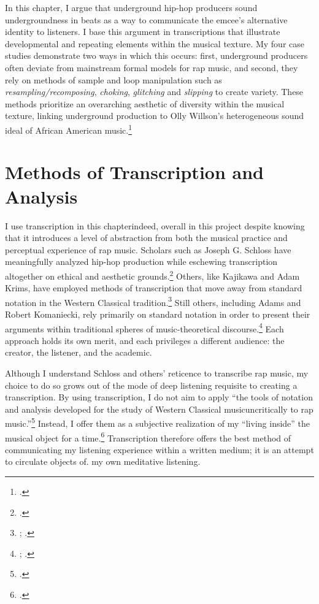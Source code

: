 In this chapter, I argue that underground hip-hop producers sound undergroundness in beats
as a way to communicate the emcee's alternative identity to listeners. I base this argument
in transcriptions that illustrate developmental and repeating elements within the musical 
texture. My four case studies demonstrate two ways in which this occurs: first, underground
producers often deviate from mainstream formal models for rap music, and second, they rely
on methods of sample and loop manipulation such as \emph{resampling/recomposing}, 
\emph{choking}, \emph{glitching} and \emph{slipping} to create variety. These methods
prioritize an overarching aesthetic of diversity within the musical texture, linking
underground production to Olly Willson's heterogeneous sound ideal of African American 
music.\footnote{
    \cite{ollywilsonHeterogeneousSoundIdeal1992}.}

\section{Methods of Transcription and Analysis} \label{methodsoftranscription}
I use transcription in this chapter\textemdash indeed, overall in this project\textemdash
despite  knowing that it introduces a level of abstraction from both the musical practice
and perceptual experience of rap music. Scholars such as Joseph G. Schloss have meaningfully
analyzed hip-hop production while eschewing transcription altogether on ethical and 
aesthetic grounds.\footnote{
    \autocite[13--15]{josephgschlossMakingBeatsArt2004}.} 
Others, like Kajikawa and Adam Krims, have employed methods of transcription that move
away from standard notation in the Western Classical tradition.\footnote{
    \autocite[29--30 and 36--37]{lorenkajikawaSoundingRaceRap2015};
    \autocite[105--110]{adamkrimsRapMusicPoetics2000}.} 
Still others, including Adams and Robert Komaniecki, rely primarily on standard notation
in order to present their arguments within traditional spheres of music-theoretical
discourse.\footnote{
    \cite{kyleadamsMetricalTechniquesFlow2009}; 
    \cite{robertkomanieckiAnalyzingCollaborativeFlow2017}.} 
Each approach holds its own merit, and each privileges a different audience: the creator,
the listener, and the academic.

Although I understand Schloss and others' reticence to transcribe rap music, my choice
to do so grows out of the mode of deep listening requisite to creating a transcription.
By using transcription, I do not aim to apply ``the tools of notation and analysis 
developed for the study of Western Classical music\textellipsis uncritically to rap
music.''\footnote{
    \autocite[12]{lorenkajikawaSoundingRaceRap2015}.}
Instead, I offer them as a subjective realization of my ``living inside'' the musical
object for a time.\footnote{
    \autocite[200]{peterwinklerWritingGhostNotes1997}.} 
Transcription therefore offers the best method of communicating my listening experience
within a written medium; it is an attempt to circulate objects of. my own meditative
listening.

